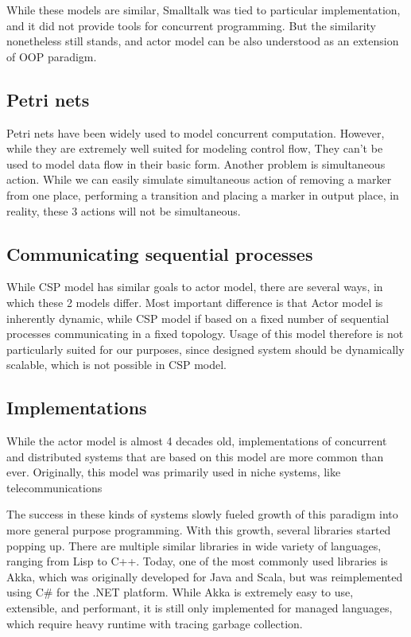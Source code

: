 While these models are similar, Smalltalk was tied to particular implementation, and it did not provide
tools for concurrent programming. But the similarity nonetheless still stands, and actor model can be also understood as
an extension of OOP paradigm.

\subsection{Petri nets}
Petri nets have been widely used to model concurrent computation. However, while they are extremely well suited
for modeling control flow, They can't be used to model data flow in their basic form. Another problem is
simultaneous action. While we can easily simulate simultaneous action of removing a marker from one place, performing
a transition and placing a marker in output place, in reality, these 3 actions will not be simultaneous.

\subsection{Communicating sequential processes}
While CSP model has similar goals to actor model, there are several ways, in which these 2 models differ.
Most important difference is that Actor model is inherently
dynamic, while CSP model if based on a fixed number of sequential processes communicating in a fixed topology\cite{Hoare:1985:CSP:3921}.
Usage of this model therefore is not particularly suited for our purposes, since designed system should be dynamically scalable,
which is not possible in CSP model.

\subsection{Implementations}
While the actor model is almost 4 decades old, implementations of concurrent and distributed systems that
are based on this model are more common than ever.
Originally, this model was primarily used in niche systems, like
telecommunications

The success in these kinds of systems slowly fueled growth of this paradigm into more general purpose programming. With this
growth, several libraries started popping up. There are multiple similar libraries in
wide variety of languages, ranging from Lisp to C++. Today, one of the most commonly used libraries is Akka\cite{web:akka}, which was originally
developed for Java and Scala, but was reimplemented using C\# for the .NET platform. While Akka is extremely easy to use,
extensible, and performant, it is still only implemented for managed languages, which require heavy runtime with tracing garbage collection.

